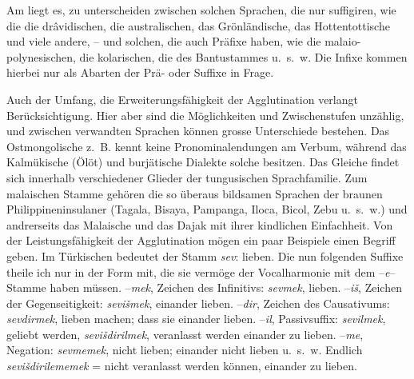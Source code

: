 \largerpage[-1]\label{IV.III.II.4.8a} Am  liegt es, zu unterscheiden zwischen solchen Sprachen, die nur suffigiren, wie die  die drâvidischen, die australischen, das Grönländische, das Hottentottische und viele andere, – und solchen, die auch Präfixe haben, wie die malaio-polynesischen, die kolarischen, die des Bantustammes u.~s.~w. Die Infixe kommen hierbei nur als Abarten der Prä- oder Suffixe in Frage.

\label{IV.III.II.4.8b} Auch der Umfang, die Erweiterungsfähigkeit der Agglutination verlangt Berücksichtigung. Hier aber sind die Möglichkeiten und \label{fp.332} Zwischenstufen unzählig, und zwischen verwandten Sprachen können grosse Unterschiede bestehen. Das Ostmongolische z.~B. kennt keine Pronominalendungen am Verbum, während das Kalmükische (Ölöt) und burjätische Dialekte solche besitzen. Das Gleiche findet sich innerhalb verschiedener Glieder der tungusischen Sprachfamilie. Zum malaischen Stamme gehören die so überaus bildsamen Sprachen der braunen Philippineninsulaner (Tagala, Bisaya, Pampanga, Iloca, Bicol, Zebu u.~s.~w.) und andrerseits das Malaische und das Dajak mit ihrer kindlichen Einfachheit. Von der Leistungsfähigkeit der Agglutination mögen ein paar Beispiele einen Begriff geben. Im Türkischen bedeutet der Stamm \textit{sev}: lieben. Die nun folgenden Suffixe theile ich nur in der Form mit, die sie vermöge der Vocalharmonie mit dem –\textit{e}–Stamme haben müssen. –\textit{mek}, Zeichen des Infinitivs: \textit{sevmek}, lieben. –\textit{iš}, Zeichen der  Gegenseitigkeit: \textit{sevišmek}, einander lieben. –\textit{dir}, Zeichen des Causativums: \textit{sevdirmek}, lieben machen;   dass sie einander lieben. –\textit{il}, Passivsuffix: \textit{sevilmek}, geliebt werden, \textit{sevišdirilmek}, veranlasst werden einander zu lieben. –\textit{me}, Negation: \textit{sevmemek}, nicht lieben;   einander nicht lieben u.~s.~w. Endlich \textit{sevišdirilememek} = nicht veranlasst werden können, einander zu lieben. 

